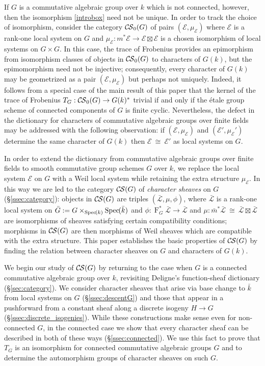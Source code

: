 \documentclass[10pt]{amsart}
\theoremstyle{plain}
\theoremstyle{definition}
\theoremstyle{remark}
\newcommand{\bFq}{\bar{k}}
\newcommand{\Fq}{k}
\newcommand{\Frob}[1]{\operatorname{F}_{#1}}
\newcommand{\Spec}[1]{{\operatorname{Spec}\hskip-1pt( #1 )}}
\newcommand{\iso}{{\ \cong\ }}
\newcommand{\TrFrob}[1]{T_{#1}}
\newcommand{\cs}[1]{{\mathcal{#1}}}
\newcommand{\gcs}[1]{{\mathcal{\bar #1}}}
\newcommand{\CS}{{\mathcal{C\hskip-0.8pt S}}}
\newcommand{\bCS}{{\CS_0}}
\begin{document}
If $G$ is a commutative algebraic group over $\Fq$ which is not connected, however, then the isomorphism \eqref{introbox} need not be unique. In order to track the choice of isomorphism, consider the category $\bCS(G)$ of pairs $(\cs{E},\mu_\cs{E})$ where $\cs{E}$ is a rank-one local system on $G$ and $\mu_\cs{E} : m^*\cs{E} \to \cs{E}\boxtimes\cs{E}$ is a chosen isomorphism of local systems on $G\times G$. 
In this case, the trace of Frobenius provides an epimorphism from isomorphism classes of objects in $\bCS(G)$ to characters of $G(\Fq)$, but the epimomorphism need not be injective; consequently,
every character of $G(\Fq)$ may be geometrized as a pair $(\cs{E},\mu_\cs{E})$ but perhaps not uniquely.
Indeed, it follows from a special case of the main result of this paper that the kernel of the trace of Frobenius $T_{G} : \bCS(G) \to G(\Fq)^*$ trivial if and only if the \'etale group scheme of connected components of $G$ is finite cyclic.
Nevertheless, the defect in the dictionary for characters of commutative algebraic groups over finite fields may be addressed with the following observation: if $(\cs{E},\mu_\cs{E})$ and $(\cs{E}',\mu_\cs{E}')$ determine the same character of $G(\Fq)$ then $\cs{E}\iso \cs{E}'$ as local systems on $G$.


In order to extend the dictionary from commutative algebraic groups over finite fields to smooth commutative group schemes $G$ over $\Fq$,
we replace the local system $\cs{E}$ on $G$ with a Weil local system while retaining the extra structure $\mu_\cs{E}$. 
In this way we are led to the category $\CS(G)$ of {\it character sheaves} on $G$ (\S\ref{ssec:category}):
objects in $\CS(G)$ are triples $(\gcs{L}, \mu,\phi)$, where $\gcs{L}$ is a rank-one local system on ${\bar G} := G\times_{\Spec{\Fq}} \Spec{\bFq}$
and $\phi : \Frob{G}^* \gcs{L}\to \gcs{L}$ and $\mu : {\bar m}^* \gcs{L} \iso \gcs{L} \boxtimes \gcs{L}$ are isomorphisms of sheaves satisfying certain compatibility conditions;
morphisms in $\CS(G)$ are then morphisms of Weil sheaves which are compatible with the extra structure.
This paper establishes the basic properties of $\CS(G)$ by finding the relation between character sheaves on $G$ and characters of $G(\Fq)$.

We begin our study of $\CS(G)$ by returning to the case when $G$ is a connected commutative algebraic group over $\Fq$, revisiting Deligne's function-sheaf dictionary (\S\ref{sec:category}).
We consider character sheaves that arise via base change to $\bFq$ from local systems on $G$ (\S\ref{ssec:descentG}) and
those that appear in a pushforward from a constant sheaf along a discrete isogeny $H \to G$ (\S\ref{ssec:discrete_isogenies}).  
While these constructions make sense even for non-connected $G$, in the connected case we show that every character sheaf can be described in both of these ways (\S\ref{ssec:connected}).  
We use this fact to prove that $\TrFrob{G}$ is an isomorphism for connected commutative algebraic groups $G$
and to determine the automorphism groups of character sheaves on such $G$. 
\end{document}
